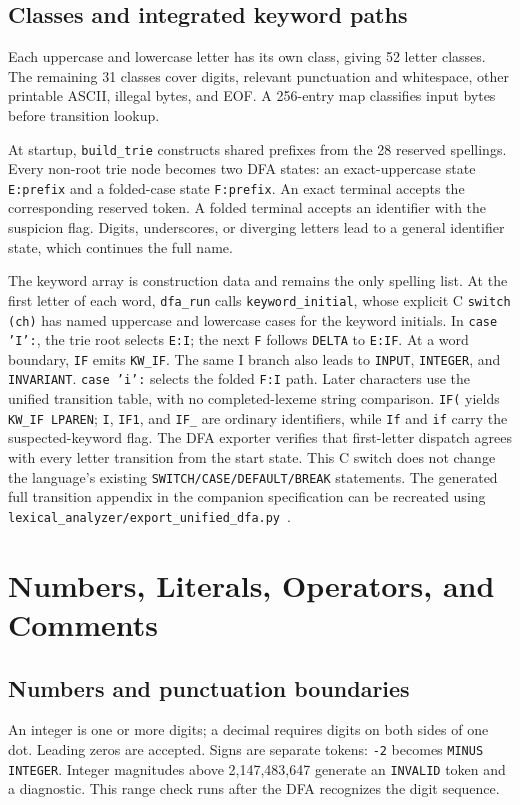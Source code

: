 \documentclass[11pt,a4paper]{article}
\newcommand{\code}[1]{\texttt{#1}}
\begin{document}
\subsection{Classes and integrated keyword paths}
Each uppercase and lowercase letter has its own class, giving 52 letter
classes. The remaining 31 classes cover digits, relevant punctuation and
whitespace, other printable ASCII, illegal bytes, and EOF. A 256-entry map
classifies input bytes before transition lookup.

At startup, \code{build\_trie} constructs shared prefixes from the 28 reserved
spellings. Every non-root trie node becomes two DFA states: an exact-uppercase
state \code{E:prefix} and a folded-case state \code{F:prefix}. An exact terminal
accepts the corresponding reserved token. A folded terminal accepts an
identifier with the suspicion flag. Digits, underscores, or diverging letters
lead to a general identifier state, which continues the full name.

The keyword array is construction data and remains the only spelling list.
At the first letter of each word, \code{dfa\_run} calls
\code{keyword\_initial}, whose explicit C \code{switch (ch)} has named
uppercase and lowercase cases for the keyword initials.
In \code{case 'I':}, the trie root selects \code{E:I}; the next
\code{F} follows \code{DELTA} to \code{E:IF}. At a word boundary,
\code{IF} emits \code{KW\_IF}. The same I branch also leads to
\code{INPUT}, \code{INTEGER}, and \code{INVARIANT}.
\code{case 'i':} selects the folded \code{F:I} path.
Later characters use the unified transition table, with no completed-lexeme
string comparison. \code{IF(} yields \code{KW\_IF LPAREN};
\code{I}, \code{IF1}, and \code{IF\_} are ordinary identifiers,
while \code{If} and \code{if} carry the suspected-keyword flag.
The DFA exporter verifies that first-letter dispatch agrees with every
letter transition from the start state. This C switch does not change the
language's existing \code{SWITCH/CASE/DEFAULT/BREAK} statements. The generated full transition appendix in
the companion specification can be recreated using
\code{lexical\_analyzer/export\_unified\_dfa.py}~\cite{export}.

\clearpage
\section{Numbers, Literals, Operators, and Comments}
\subsection{Numbers and punctuation boundaries}
An integer is one or more digits; a decimal requires digits on both sides of
one dot. Leading zeros are accepted. Signs are separate tokens: \code{-2}
becomes \code{MINUS INTEGER}. Integer magnitudes above 2,147,483,647 generate
an \code{INVALID} token and a diagnostic. This range check runs after the DFA
recognizes the digit sequence.
\end{document}

